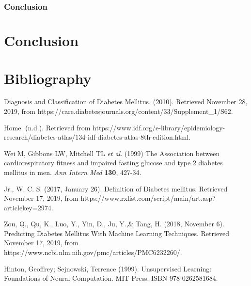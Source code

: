 \documentclass[12pt]{article}
\begin{document}
\newpage
\section{Conclusion}


\newpage
\part{Conclusion}

\clearpage
\newpage
\part{Bibliography}
\begin{thebibliography}{}
Diagnosis and Classification of Diabetes Mellitus. (2010). Retrieved November 28, 2019, from https://care.diabetesjournals.org/content/33/Supplement\_1/S62.

Home. (n.d.). Retrieved from https://www.idf.org/e-library/epidemiology-research/diabetes-atlas/134-idf-diabetes-atlas-8th-edition.html.

Wei M, Gibbons LW, Mitchell TL \textit{et al}. (1999) The Association between cardiorespiratory fitness and impaired fasting glucose and type 2 diabetes mellitus in men. \textit{Ann Intern Med} \textbf{130}, 427-34.

Jr., W. C. S. (2017, January 26). Definition of Diabetes mellitus. Retrieved November 17, 2019, from https://www.rxlist.com/script/main/art.asp?articlekey=2974.

Zou, Q., Qu, K., Luo, Y., Yin, D., Ju, Y.,\& Tang, H. (2018, November 6). Predicting Diabetes Mellitus With Machine Learning Techniques. Retrieved November 17, 2019, from https://www.ncbi.nlm.nih.gov/pmc/articles/PMC6232260/.

Hinton, Geoffrey; Sejnowski, Terrence (1999). Unsupervised Learning: Foundations of Neural Computation. MIT Press. ISBN 978-0262581684.



\end{thebibliography}
\end{document}
